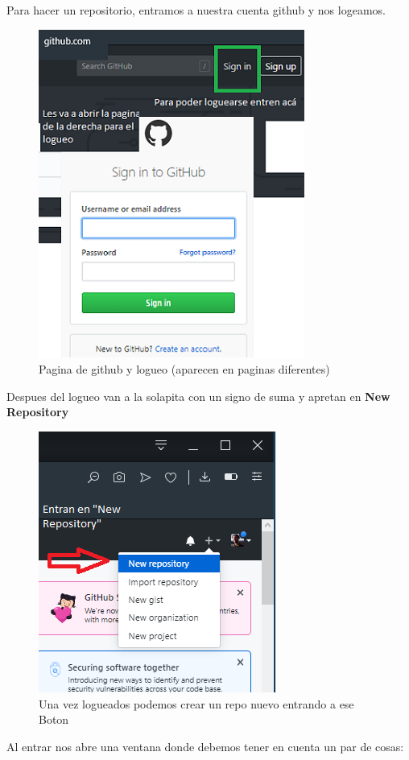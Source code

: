 \documentclass[10pt,journal,compsoc]{IEEEtran}
\begin{document}
Para hacer un repositorio, entramos a nuestra cuenta github y nos logeamos.
 \begin{figure}[H]
  \begin{center}
	 \includegraphics{figuras/logueo.png}
	 \centering
	 \renewcommand{\arraystretch}{1.3}
	 \caption{Pagina de github y logueo (aparecen en paginas diferentes)}
  \end{center}
\end{figure}

Despues del logueo van a la solapita con un signo de suma y apretan en \textbf{New Repository} 
 \begin{figure}[H]
  \begin{center}
	 \includegraphics{figuras/repo.png}
	 \centering
	 \renewcommand{\arraystretch}{1.3}
	 \caption{Una vez logueados podemos crear un repo nuevo entrando a ese Boton}
  \end{center}
\end{figure}
Al entrar nos abre una ventana donde debemos tener en cuenta un par de cosas:
\end{document}
